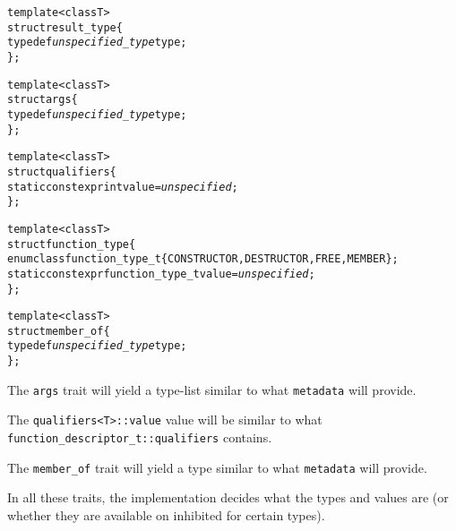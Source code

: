 \begin{alltt}
  template <class T>
  struct result\_type \{
    typedef \emph{unspecified\_type} type;
  \};
  
  template <class T>
  struct args \{
    typedef \emph{unspecified\_type} type;
  \};
  
  template <class T>
  struct qualifiers \{
    static constexpr int value = \emph{unspecified};
  \};
  
  template <class T>
  struct function\_type \{
    enum class function\_type\_t \{ CONSTRUCTOR, DESTRUCTOR, FREE, MEMBER \};
    static constexpr function_type_t value = \emph{unspecified};
  \};
  
  template <class T>
  struct member_of \{
    typedef \emph{unspecified\_type} type;
  \};
\end{alltt}

The \verb+args+ trait will yield a type-list similar to what \verb+metadata+
will provide.

The \verb+qualifiers<T>::value+ value will be similar to what
\verb+function_descriptor_t::qualifiers+ contains.

The \verb+member_of+ trait will yield a type similar to what \verb+metadata+
will provide.

In all these traits, the implementation decides what the types and values are
(or whether they are available on inhibited for certain types).